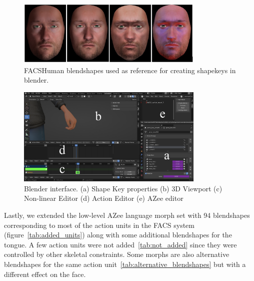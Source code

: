 \documentclass[../../main]{subfiles}
\begin{document}
\begin{figure}
    \centering
    \includegraphics[width=0.8\textwidth]{chapters/facial_expressions/images/facshuman_blendshapes.png}
    \caption{FACSHuman blendshapes used as reference for creating shapekeys in blender.}
    \label{ch:facial_expressions:fig:facshuman_blendshapes}
\end{figure}

\begin{figure}
    \centering
    \includegraphics[width=0.8\textwidth]{chapters/facial_expressions/images/shape_keys.png}
    \caption{Blender interface. (a) Shape Key properties (b) 3D Viewport (c) Non-linear Editor (d) Action Editor (e) AZee editor}
    \label{ch:facial_expressions:fig:shape_keys}
\end{figure}

Lastly, we extended the low-level AZee language morph set with 94 blendshapes corresponding to most of the action units in the FACS system (figure~\ref{tab:added_units}) along with some additional blendshapes for the tongue. A few action units were not added~\ref{tab:not_added} since they were controlled by other skeletal constraints. Some morphs are also alternative blendshapes for the same action unit~\ref{tab:alternative_blendshapes} but with a different effect on the face.
\end{document}

